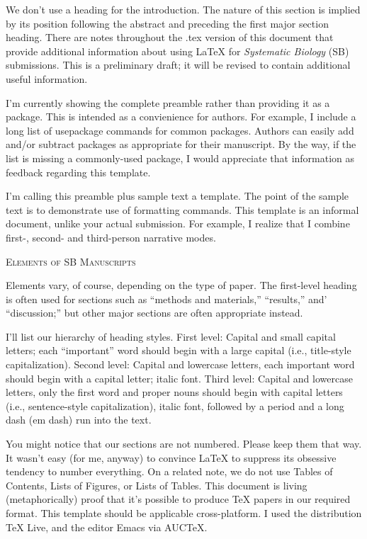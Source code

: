 \documentclass[12pt,letterpaper]{article}
\renewcommand{\section}[1]{%
\bigskip
\begin{center}
\begin{Large}
\normalfont\scshape #1
\medskip
\end{Large}
\end{center}}
\begin{document}

\vspace{1.5in}

We don't use a heading for the introduction. The nature of this section is implied by its position following the abstract and preceding the first major section heading.
There are notes throughout the .tex version of this document that
provide additional information about using LaTeX for {\it Systematic
  Biology} (SB) submissions. This is a preliminary draft; it will be
revised to contain additional useful information.
 
I'm currently showing
the complete preamble rather than providing it as a package. This is
intended as a convienience for authors. For example, I include a long
list of usepackage commands for common packages. Authors can easily
add and/or subtract packages as appropriate for their manuscript. By
the way, if
the list is missing a commonly-used package, I would appreciate that
information as feedback regarding this template.

I'm calling this preamble plus sample text a template. The point of
the sample text is to demonstrate use of formatting commands. This template is an informal document, unlike your actual submission. For example, I realize that I combine first-, second- and third-person narrative modes.  

\section{Elements of SB Manuscripts}

Elements vary, of course, depending on the type of paper. The first-level
heading is often used for sections such as ``methods and materials,''
``results,'' and' ``discussion;'' but other major sections are often
appropriate instead.

I'll list our hierarchy of heading styles. First level: Capital and
small capital letters; each ``important'' word should begin with a large capital
(i.e., title-style capitalization). Second level: Capital and
lowercase letters, each important word should begin with a capital
letter; italic font. Third level: Capital and lowercase letters, only
the first word and proper nouns should begin with capital letters
(i.e., sentence-style capitalization), italic font, followed by a
period and a long dash (em dash) run into the text.

You might notice that our sections are not numbered. Please keep them
that way. It wasn't easy (for me, anyway) to convince LaTeX to suppress
its obsessive tendency to number everything. On a related note, we do
not use
Tables of Contents, Lists of Figures, or Lists of Tables. This document is
living (metaphorically) proof that it's possible to produce TeX papers
in our required format. This template should be applicable
cross-platform. I used the distribution TeX Live, and the editor Emacs via
AUCTeX.
\end{document}
